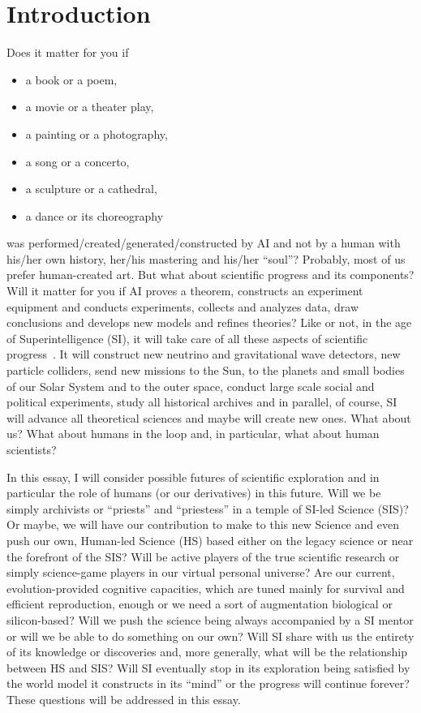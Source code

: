 \documentclass[a4paper,11pt]{article}
\begin{document}
\newpage

 	\tableofcontents




\newpage

    \section{Introduction}

    \noindent Does it matter for you if 
\begin{itemize}
    \item a book or a poem,
    \item a movie or a theater play,
    \item a painting or a photography,
    \item a song or a concerto,
    \item a sculpture or a cathedral,
    \item a dance or its choreography
\end{itemize}
was performed/created/generated/constructed by AI and not by a human with his/her own history, her/his mastering and his/her ``soul''? Probably, most of us prefer human-created art. But what about scientific progress and its components?
Will it matter for you if AI proves a theorem, constructs an experiment equipment and conducts experiments, collects and analyzes data, draw conclusions and develops new models and refines theories? Like or not, in the age of Superintelligence (SI), it will take care of all these aspects of scientific progress~\parencite{moravec1998will,moravec1999rise}. It will construct new neutrino and gravitational wave detectors, new particle colliders, send new missions to the Sun, to the planets and small bodies of our Solar System and to the outer space, conduct large scale social and political experiments, study all historical archives and in parallel, of course, SI will advance all theoretical sciences and maybe will create new ones. What about us? What about humans in the loop and, in particular, what about human scientists?

In this essay, I will consider possible futures of scientific exploration and in particular the role of humans (or our derivatives) in this future. Will we be simply archivists or ``priests'' and ``priestess'' in a temple of SI-led Science (SIS)? Or maybe, we will have our contribution to make to this new Science and even push our own, Human-led Science (HS) based either on the legacy science or near the forefront of the SIS? Will be active players of the true scientific research or simply science-game players in our virtual personal universe? Are our current, evolution-provided cognitive capacities, which are tuned mainly for survival and efficient reproduction, enough or we need a sort of augmentation biological or silicon-based? Will we push the science being always accompanied by a SI mentor or will we be able to do something on our own? Will SI share with us the entirety of its knowledge or discoveries and, more generally, what will be the relationship between HS and SIS? Will SI eventually stop in its exploration being satisfied by the world model it constructs in its ``mind'' or the progress will continue forever? These questions will be addressed in this essay.
\end{document}
